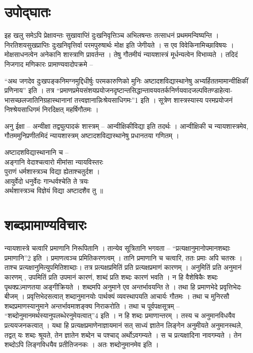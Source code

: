 \chapter{उपोद्घातः}
	
	इह खलु समेऽपि प्रेक्षावन्तः सुखावाप्तिं दुःखनिवृत्तिञ्च अभिलषन्तः तत्साधनं प्रथममन्विष्यन्ति । निरतिशयसुखप्राप्तिः दुःखनिवृत्तिर्वा परमपुरुषार्थः मोक्ष इति जेगीयते । स एव विवेकिनामिच्छाविषयः । मोक्षसाधनत्वेन अनेकानि शास्त्राणि प्रावर्तन्त । तेषु गौतमीयं न्यायशास्त्रं मूर्धन्यत्वेन विभाव्यते । तदिदं निजगाद मणिकारः प्रामाण्यवादोपक्रमे – 

	“अथ जगदेव दुःखपङ्कनिमग्नमुद्दिधीर्षुः परमकारुणिको मुनिः अष्टादशविद्यास्थानेषु अभ्यर्हिततमामान्वीक्षिकीं प्रणिनाय” इति । तत्र “प्रमाणप्रमेयसंशयप्रयोजनदृष्टान्तसिद्धान्तावयवतर्कनिर्णयवादजल्पवितण्डाहेत्वा-भासच्छलजातिनिग्रहास्थानानां तत्त्वज्ञानान्निःश्रेयसाधिगमः”1 इति । सूत्रेण शास्त्रस्यास्य परमप्रयोजनं निश्श्रेयसाधिगमं निरदिक्षत् महर्षिगौतमः ।

	अनु ईक्षा – अन्वीक्षा तद्व्युत्पादकं शास्त्रम् – आन्वीक्षिकीविद्या इति तदर्थः । आन्वीक्षिकी च न्यायशास्त्रमेव, गौतममुनिप्रणीतमिदं न्यायशास्त्रम् अष्टादशविद्यास्थानेषु प्रधानतया गणितम् । 

	अष्टादशविद्यास्थानानि च – \\
		अङ्गानि वेदाश्चत्वारो मीमांसा न्यायविस्तरः\\ 
		पुराणं धर्मशास्त्रञ्च विद्या ह्येताश्चतुर्दश ।\\
		आयुर्वेदो धनुर्वेदः गान्धर्वश्चेति ते त्रयः \\
		अर्थशास्त्रञ्च विज्ञेयं विद्या अष्टादशैव तु ॥ \\

\chapter{शब्दप्रामाण्यविचारः }
	
	न्यायशास्त्रे चत्वारि प्रमाणानि निरूपितानि । तान्येव सूत्रितानि भगवता – “प्रत्यक्षानुमानोपमानशब्दाः प्रमाणानि”2 इति । प्रमाणत्वञ्च प्रमितिकरणत्वम् । तानि प्रमाणानि च चत्वारि, ततः प्रमाः अपि चतस्रः । ताश्च प्रत्यक्षानुमित्युपमितिशाब्दाः। तत्र प्रत्यक्षप्रमितिं प्रति प्रत्यक्षप्रमाणं कारणम् । अनुमितिं प्रति अनुमानं कारणम् , उपमितिं प्रति उपमानं कारणं, शाब्दं प्रति शब्दः कारणं भवति । न हि वैशेषिकैः शब्दः पृथक्प्र3माणतया अङ्गीक्रियते । शब्दमपि अनुमाने एव अन्तर्भावयन्ति ते । तथा हि प्रमाणभेदे प्रवृत्तिभेदः बीजम् । प्रवृत्तिभेदसत्वात् शब्दानुमानयोः पार्थक्यं व्यवस्थापयति आचार्यः गौतमः । तथा च मुनिरसौ शब्दप्रमाणस्यानुमाने अन्तर्भावमाशङ्क्य निराकरोति । तथा च पूर्वपक्षसूत्रम् – “शब्दोनुमानमर्थस्यानुपलब्धेरनुमेयत्वात्”4 इति । न हि शब्दः प्रमाणान्तरम् । तस्य च अनुमानविधयैव प्रत्ययजनकत्वात् । यथा हि प्रत्यक्षप्रमाणेनाज्ञायमानं सत् साध्यं ज्ञातेन लिङ्गेन अनुमीयते अनुमानस्थले, तद्वत् यः शब्दः श्रूयते, तेन ज्ञातेन शब्देन च पश्चाद् अर्थोऽवगम्यते । स च प्रत्यक्षादिना   नावगम्यते । तेन शब्दोऽपि लिङ्गविधयैव प्रतीतिजनकः । अतः शब्दोनुमानमेव  इति ।
	
